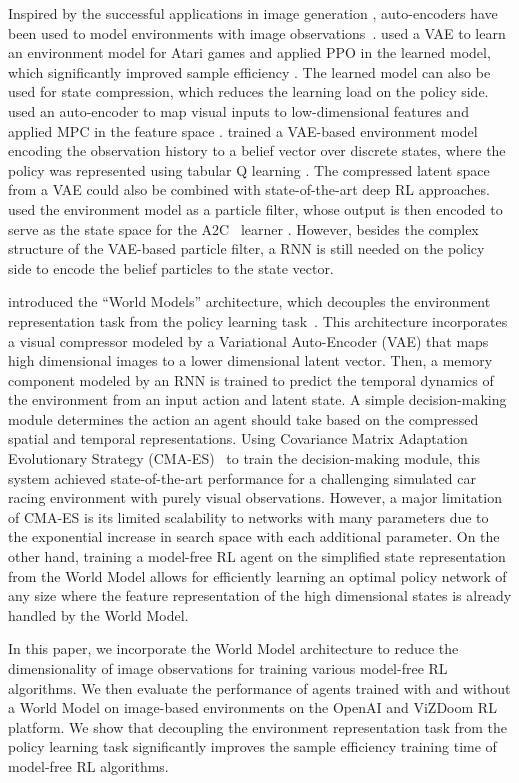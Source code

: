 Inspired by the successful applications in image generation \cite{pu2016variational,yan2016attribute2image}, auto-encoders have been used to model environments with image observations~\cite{hirose2019deep}. \citeauthor{kaiser2019model} used a VAE to learn an environment model for Atari games and applied PPO in the learned model, which significantly improved sample efficiency \cite{kaiser2019model}. The learned model can also be used for state compression, which reduces the learning load on the policy side. \citeauthor{wahlstrom2015pixels} used an auto-encoder to map visual inputs to low-dimensional features and applied MPC in the feature space \cite{wahlstrom2015pixels}. \citeauthor{corneil2018efficient} trained a VAE-based environment model encoding the observation history to a belief vector over discrete states, where the policy was represented using tabular Q learning \cite{corneil2018efficient}. The compressed latent space from a VAE could also be combined with state-of-the-art deep RL approaches. \citeauthor{igl2018deep} used the environment model as a particle filter, whose output is then encoded to serve as the state space for the A2C~\cite{openaibaselines} learner \cite{igl2018deep}. However, besides the complex structure of the VAE-based particle filter, a RNN is still needed on the policy side to encode the belief particles to the state vector.

\citeauthor{ha2018recurrent} introduced the ``World Models'' architecture, which decouples the environment representation task from the policy learning task~\cite{ha2018recurrent}. This architecture incorporates a visual compressor modeled by a Variational Auto-Encoder (VAE) that maps high dimensional images to a lower dimensional latent vector. Then, a memory component modeled by an RNN is trained to predict the temporal dynamics of the environment from an input action and latent state. A simple decision-making module determines the action an agent should take based on the compressed spatial and temporal representations. Using Covariance Matrix Adaptation Evolutionary Strategy (CMA-ES)~\cite{hansen2016cma} to train the decision-making module, this system achieved state-of-the-art performance for a challenging simulated car racing environment with purely visual observations. However, a major limitation of CMA-ES is its limited scalability to networks with many parameters due to the exponential increase in search space with each additional parameter. On the other hand, training a model-free RL agent on the simplified state representation from the World Model allows for efficiently learning an optimal policy network of any size where the feature representation of the high dimensional states is already handled by the World Model.

In this paper, we incorporate the World Model architecture to reduce the dimensionality of image observations for training various model-free RL algorithms. We then evaluate the performance of agents trained with and without a World Model on image-based environments on the OpenAI and ViZDoom RL platform. We show that decoupling the environment representation task from the policy learning task significantly improves the sample efficiency training time of model-free RL algorithms.

